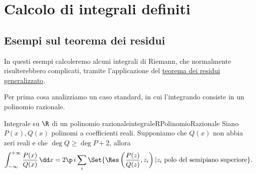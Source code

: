 \chapter{Calcolo di integrali definiti}
%
%
\section{Esempi sul teorema dei residui}

In questi esempi calcoleremo alcuni integrali di Riemann, che normalmente risulterebbero complicati, tramite l'applicazione del \hyperref[th:teoremaResiduiGeneralizzato]{teorema dei residui generalizzato}.

Per prima cosa analizziamo un caso standard, in cui l'integrando consiste in un polinomio razionale.

\begin{prop}{Integrale su \(\R\) di un polinomio razionale}{integraleRPolinomioRazionale}
	Siano \(P(x),Q(x)\) polinomi a coefficienti reali.
	Supponiamo che \(Q(x)\) non abbia zeri reali e che \(\deg Q \ge \deg P+2\), allora
	\[
		\int_{-\infty}^{+\infty} \frac{P(x)}{Q(x)}\,\dd x = 2\p\,i \sum_{i} \Set{\Res \left( \frac{P(z)}{Q(z)},z_i \right) | z_i \text{ polo del semipiano superiore}}.
	\]
\end{prop}

